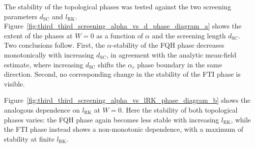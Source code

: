 The stability of the topological phases was tested against the two screening parameters $d_{\text{SC}}$ and $l_{\text{RK}}$. Figure~\ref{fig:third_third_screening_alpha_vs_d_phase_diagram_a} shows the extent of the phases at $W=0$ as a function of $\alpha$ and the screening length $d_{\text{SC}}$. Two conclusions follow. First, the $\alpha$-stability of the FQH phase decreases monotonically with increasing $d_{\text{SC}}$, in agreement with the analytic mean-field estimate, where increasing $d_{\text{SC}}$ shifts the $\alpha_c$ phase boundary in the same direction. Second, no corresponding change in the stability of the FTI phase is visible.

Figure~\ref{fig:third_third_screening_alpha_vs_lRK_phase_diagram_b} shows the analogous dependence on $l_{\text{RK}}$ at $W=0$. Here the stability of both topological phases varies: the FQH phase again becomes less stable with increasing $l_{\text{RK}}$, while the FTI phase instead shows a non-monotonic dependence, with a maximum of stability at finite $l_{\text{RK}}$.

